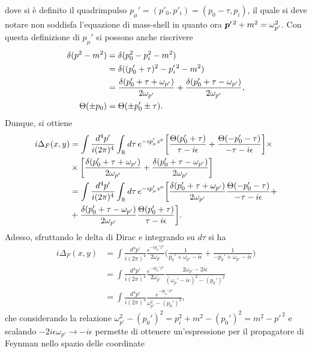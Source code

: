 dove si è definito il quadrimpulso $p_\mu' = (p'_0,p'_i) = (p_0 - \tau,p_i)$, il quale si deve notare non soddisfa l'equazione di mass-shell in quanto ora $\bm{p}'^{\,2} + m^2 = \omega_{p'}^2$. Con questa definizione di $p_\mu'$ si possono anche riscrivere
\begin{align}
    \delta(p^2 - m^2) &= \delta(p_0^2 - p_i^2 - m^2) \notag\\
    &= \delta((p'_0 + \tau)^2 - p_i'^{\,2} - m^2) \\
    &= \frac{\delta(p'_0 + \tau + \omega_{p'})}{2\omega_{p'}} + \frac{\delta(p'_0 + \tau - \omega_{p'})}{2\omega_{p'}}, \notag\\
    \Theta(\pm p_0) &= \Theta(\pm p_0' \pm \tau).
\end{align}
Dunque, si ottiene
\begin{equation}
    \begin{split}
        i\Delta_F(x,y) &= \int\frac{d^4p'}{i(2\pi)^4}\int_{\mathbb{R}} d\tau\,e^{-ip_\mu'z^\mu}\bigg[\frac{\Theta(p_0' + \tau)}{\tau - i\epsilon} + \frac{\Theta(-p_0' - \tau)}{-\tau - i\epsilon}\bigg]\times \\
        &\times\bigg[\frac{\delta(p'_0 + \tau + \omega_{p'})}{2\omega_{p'}} + \frac{\delta(p'_0 + \tau - \omega_{p'})}{2\omega_{p'}}\bigg] \\
        &= \int\frac{d^4p'}{i(2\pi)^4}\int_{\mathbb{R}} d\tau\,e^{-ip_\mu'z^\mu}\bigg[\frac{\delta(p'_0 + \tau + \omega_{p'})}{2\omega_{p'}}\frac{\Theta(-p_0' - \tau)}{-\tau - i\epsilon}+ \\
        &+ \frac{\delta(p'_0 + \tau - \omega_{p'})}{2\omega_{p'}}\frac{\Theta(p_0' + \tau)}{\tau - i\epsilon}\bigg].
    \end{split}
\end{equation}
Adesso, sfruttando le delta di Dirac e integrando su $d\tau$ si ha
\begin{equation}
    \begin{split}
        i\Delta_F(x,y) &= \int\frac{d^4p'}{i(2\pi)^4}\frac{e^{-ip_\mu'z^\mu}}{2\omega_{p'}}\bigg(\frac{1}{p_0' + \omega_{p'} - i\epsilon} + \frac{1}{-p_0' + \omega_{p'} - i\epsilon}\bigg) \\
        &= \int\frac{d^4p'}{i(2\pi)^4}\frac{e^{-ip_\mu'z^\mu}}{2\omega_{p'}}\frac{2\omega_{p'} - 2i\epsilon}{(\omega_p' - i\epsilon)^2 - (p_0')^2} \\
        &= \int\frac{d^4p'}{i(2\pi)^4}\frac{e^{-ip_\mu'z^\mu}}{\omega_{p'}^2 - (p_0')^2},
    \end{split}
\end{equation}
che considerando la relazione $\omega_{p'}^2 - (p_0')^2 = p_i^2 + m^2 - (p_0')^2 = m^2 - p'^{\,2}$ e scalando $-2i\epsilon\omega_{p'}\to -i\epsilon$ permette di ottenere un'espressione per il propagatore di Feynman nello spazio delle coordinate

